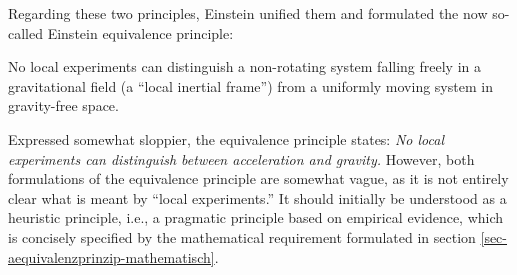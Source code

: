 %
%
%
Regarding these two principles, Einstein unified them and formulated the now so-called Einstein equivalence principle:

\begin{axiom}
	\label{equivalence-principle}%
	\cite[S. 88]{Straumann-1988}
	No local experiments can distinguish a non-rotating system falling freely in a gravitational field (a “local inertial frame”) from a uniformly moving system in gravity-free space.
\end{axiom}

\noindent
Expressed somewhat sloppier, the equivalence principle states:
\emph{No local experiments can distinguish between acceleration and gravity.}
%
However, both formulations of the equivalence principle are somewhat vague, 
as it is not
entirely clear what is meant by “local experiments.”
It should initially be understood as a heuristic principle, i.e., a pragmatic principle based on empirical evidence, which is concisely specified by the
mathematical requirement formulated in section \ref{sec-aequivalenzprinzip-mathematisch}.


